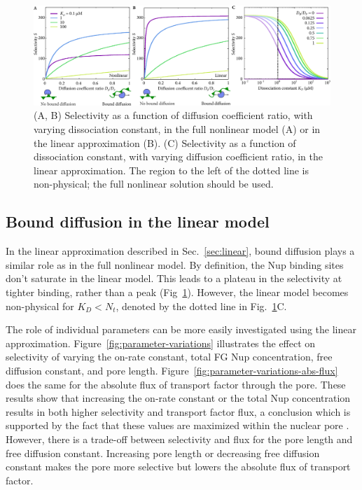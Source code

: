 \begin{figure}
\centering
\includegraphics[width=\linewidth]{figs/ch02/linear-selectivity.pdf}
\caption[Selectivity in the linear approximation.]{(A, B) Selectivity as a function of diffusion coefficient
  ratio, with varying dissociation constant, in the full nonlinear
  model (A) or in the linear approximation (B).  (C) Selectivity as a
  function of dissociation constant, with varying diffusion
  coefficient ratio, in the linear approximation.  The region to the
  left of the dotted line is non-physical; the full nonlinear solution
  should be used.}
\label{fig:linear-selectivity}
\end{figure}

\subsection{Bound diffusion in the linear model}

In the linear approximation described in Sec.~\ref{sec:linear}, bound diffusion plays a similar role as in the full nonlinear model.  By definition, the Nup binding sites don't saturate in the linear model.  This leads to a plateau in the selectivity at tighter binding, rather than a peak (Fig~\ref{fig:linear-selectivity}).  However, the linear model becomes non-physical for $K_D < N_t$, denoted by the dotted line in Fig.~\ref{fig:linear-selectivity}C.

The role of individual parameters can be more easily investigated using the linear approximation.  Figure~\ref{fig:parameter-variations} illustrates the effect on selectivity of varying the on-rate constant, total FG Nup concentration, free diffusion constant, and pore length.  Figure~\ref{fig:parameter-variations-abs-flux} does the same for the absolute flux of transport factor through the pore.  These results show that increasing the on-rate constant or the total Nup concentration results in both higher selectivity and transport factor flux, a conclusion which is supported by the fact that these values are maximized within the nuclear pore \cite{milles15, hough15}.  However, there is a trade-off between selectivity and flux for the pore length and free diffusion constant.  Increasing pore length or decreasing free diffusion constant makes the pore more selective but lowers the absolute flux of transport factor.



